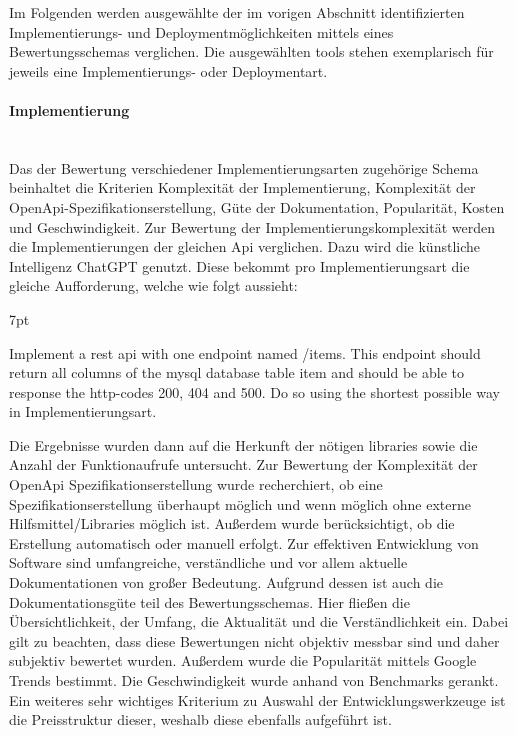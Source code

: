 \documentclass[notitlepage, hidelinks]{article}
\newenvironment{formal}{%
  \def\FrameCommand{%
    \hspace{1pt}%
    {\color{black}\vrule width 2pt}%
    {\color{formalshade}\vrule width 4pt}%
    \colorbox{formalshade}%
  }%
  \MakeFramed{\advance\hsize-\width\FrameRestore}%
  \noindent\hspace{-4.55pt}%
  \begin{adjustwidth}{}{7pt}%
  \vspace{2pt}\vspace{2pt}%
}
{%
  \vspace{2pt}\end{adjustwidth}\endMakeFramed%
}
\begin{document}
Im Folgenden werden ausgewählte der im vorigen Abschnitt identifizierten Implementierungs- und Deploymentmöglichkeiten mittels eines Bewertungsschemas verglichen. Die ausgewählten tools stehen exemplarisch für jeweils eine Implementierungs- oder Deploymentart.

\paragraph{Implementierung} \mbox{} \\
Das der Bewertung verschiedener Implementierungsarten zugehörige Schema beinhaltet die Kriterien Komplexität der Implementierung, Komplexität der OpenApi-Spezifikationserstellung, Güte der Dokumentation, Popularität, Kosten und Geschwindigkeit. Zur Bewertung der Implementierungskomplexität werden die Implementierungen der gleichen Api verglichen. Dazu wird die künstliche Intelligenz ChatGPT genutzt. Diese bekommt pro Implementierungsart die gleiche Aufforderung, welche wie folgt aussieht: 
\begin{formal}
Implement a rest api with one endpoint named /items. This endpoint should return all columns of the mysql database table item and should be able to response the http-codes 200, 404 and 500. Do so using the shortest possible way in {Implementierungsart}.
\end{formal}

Die Ergebnisse wurden dann auf die Herkunft der nötigen libraries sowie die Anzahl der Funktionaufrufe untersucht. Zur Bewertung der Komplexität der OpenApi Spezifikationserstellung wurde recherchiert, ob eine Spezifikationserstellung überhaupt möglich und wenn möglich ohne externe Hilfsmittel/Libraries möglich ist. Außerdem wurde berücksichtigt, ob die Erstellung automatisch oder manuell erfolgt. Zur effektiven Entwicklung von Software sind umfangreiche, verständliche und vor allem aktuelle Dokumentationen von großer Bedeutung. Aufgrund dessen ist auch die Dokumentationsgüte teil des Bewertungsschemas. Hier fließen die Übersichtlichkeit, der Umfang, die Aktualität und die Verständlichkeit ein. Dabei gilt zu beachten, dass diese Bewertungen nicht objektiv messbar sind und daher subjektiv bewertet wurden. Außerdem wurde die Popularität mittels Google Trends bestimmt. Die Geschwindigkeit wurde anhand von Benchmarks gerankt. Ein weiteres sehr wichtiges Kriterium zu Auswahl der Entwicklungswerkzeuge ist die Preisstruktur dieser, weshalb diese ebenfalls aufgeführt ist.
\end{document}

